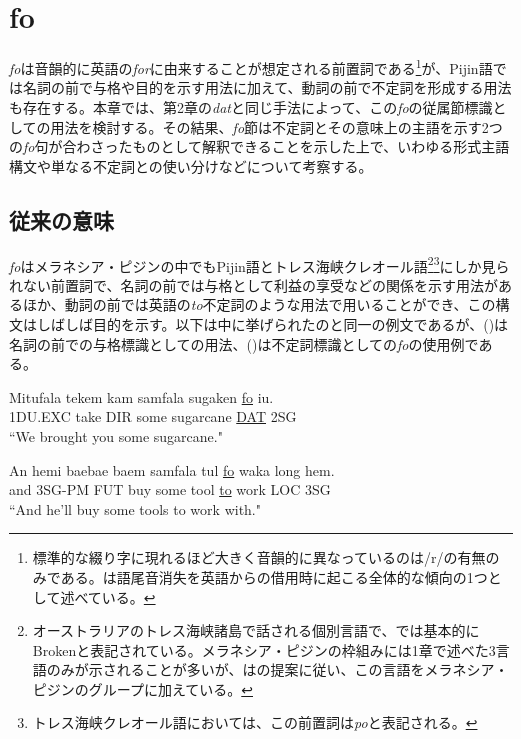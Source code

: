 \chapter{fo}
\textit{fo}は音韻的に英語の\textit{for}に由来することが想定される前置詞である\footnote{
標準的な綴り字に現れるほど大きく音韻的に異なっているのは/r/の有無のみである。\cite{phonology}は語尾音消失を英語からの借用時に起こる全体的な傾向の1つとして述べている。
}が、Pijin語では名詞の前で与格や目的を示す用法に加えて、動詞の前で不定詞を形成する用法も存在する。本章では、第2章の\textit{dat}と同じ手法によって、この\textit{fo}の従属節標識としての用法を検討する。その結果、\textit{fo}節は不定詞とその意味上の主語を示す2つの\textit{fo}句が合わさったものとして解釈できることを示した上で、いわゆる形式主語構文や単なる不定詞との使い分けなどについて考察する。

\section{従来の意味}\label{sec:originalfo}
\textit{fo}はメラネシア・ピジンの中でもPijin語とトレス海峡クレオール語\footnote{
\label{fn:broken}オーストラリアのトレス海峡諸島で話される個別言語で、\cite{prepositions}では基本的にBrokenと表記されている。メラネシア・ピジンの枠組みには1章で述べた3言語のみが示されることが多いが、\cite{prepositions}は\cite{keesing}の提案に従い、この言語をメラネシア・ピジンのグループに加えている。}\footnote{
トレス海峡クレオール語においては、この前置詞は\textit{po}と表記される\citep{prepositions}。}にしか見られない前置詞で、名詞の前では与格として利益の享受などの関係を示す用法があるほか、動詞の前では英語の\textit{to}不定詞のような用法で用いることができ、この構文はしばしば目的を示す\citep{prepositions}。以下は\cite{prepositions}中に挙げられたのと同一の例文であるが、()は名詞の前での与格標識としての用法、()は不定詞標識としての\textit{fo}の使用例である。

\begin{exe}
\ex
\gll Mitufala tekem kam samfala sugaken \underline{fo} iu.\\
1DU.EXC take DIR some sugarcane \underline{DAT} 2SG\\
\glt ``We brought you some sugarcane." \cite[44]{rr2}

\ex\label{ex:fowaka}
\gll An hemi baebae baem samfala tul \underline{fo} waka long hem.\\
and 3SG-PM FUT buy some tool \underline{to} work LOC 3SG\\
\glt ``And he'll buy some tools to work with." \cite[270]{todd}
\end{exe}

